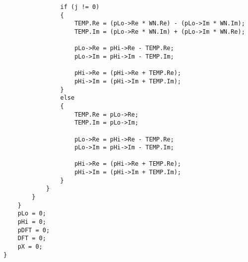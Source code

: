 \begin{tcolorbox}
\begin{verbatim}
                if (j != 0)
                {
                    TEMP.Re = (pLo->Re * WN.Re) - (pLo->Im * WN.Im);
                    TEMP.Im = (pLo->Re * WN.Im) + (pLo->Im * WN.Re);
                    
                    pLo->Re = pHi->Re - TEMP.Re;
                    pLo->Im = pHi->Im - TEMP.Im;
                    
                    pHi->Re = (pHi->Re + TEMP.Re);
                    pHi->Im = (pHi->Im + TEMP.Im);
                }
                else
                {
                    TEMP.Re = pLo->Re;
                    TEMP.Im = pLo->Im;
                    
                    pLo->Re = pHi->Re - TEMP.Re; 
                    pLo->Im = pHi->Im - TEMP.Im;
                    
                    pHi->Re = (pHi->Re + TEMP.Re);
                    pHi->Im = (pHi->Im + TEMP.Im);
                }
            }
        }
    }
    pLo = 0;
    pHi = 0;
    pDFT = 0;
    DFT = 0;
    pX = 0;
}

\end{verbatim}
\end{tcolorbox}